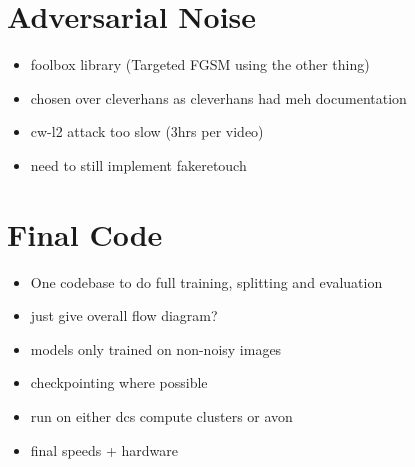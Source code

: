 \section{Adversarial Noise}

\begin{itemize}
    \item foolbox library (Targeted FGSM using the other thing)
    \item chosen over cleverhans as cleverhans had meh documentation
    \item cw-l2 attack too slow (3hrs per video)
    \item need to still implement fakeretouch
\end{itemize}

\section{Final Code}

\begin{itemize}
    \item One codebase to do full training, splitting and evaluation
    \item just give overall flow diagram?
    \item {\huge models only trained on non-noisy images}
    \item checkpointing where possible
    \item run on either dcs compute clusters or avon
    \item final speeds + hardware
\end{itemize}
